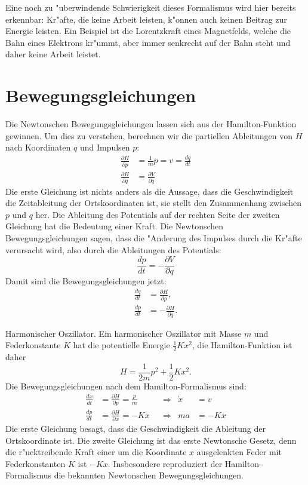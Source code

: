 Eine noch zu "uberwindende Schwierigkeit dieses Formalismus wird hier
bereits erkennbar: Kr"afte, die keine Arbeit leisten, k"onnen auch
keinen Beitrag zur Energie leisten.
Ein Beispiel ist
die Lorentzkraft eines Magnetfelds, welche die Bahn eines Elektrons 
kr"ummt, aber immer senkrecht auf der Bahn steht und daher keine Arbeit
leistet.

\section{Bewegungsgleichungen}
Die Newtonschen Bewegungsgleichungen lassen sich aus der Hamilton-Funktion
gewinnen. Um dies zu verstehen, berechnen wir die partiellen Ableitungen
von $H$ nach Koordinaten $q$ und Impulsen $p$:
\begin{align*}
\frac{\partial H}{\partial p}&=\frac{1}{m}p=v=\frac{dq}{dt} \\
\frac{\partial H}{\partial q}&=\frac{\partial V}{\partial q}
\end{align*}
Die erste Gleichung ist nichts anders als die Aussage, dass die
Geschwindigkeit die Zeitableitung der Ortskoordinaten ist, sie
stellt den Zusammenhang zwischen $p$ und $q$ her.
Die Ableitung des Potentials auf der rechten Seite der zweiten
Gleichung hat die Bedeutung einer Kraft.
Die Newtonschen Bewegungsgleichungen sagen, dass die "Anderung des
Impulses durch die Kr"afte verursacht wird, also durch die Ableitungen
des Potentials:
\[
\frac{dp}{dt}=-\frac{\partial V}{\partial q}
\]
Damit sind die Bewegungsgleichungen jetzt:
\begin{align}
\frac{dq}{dt}&= \frac{\partial H}{\partial p},\label{hamilton-v}\\
\frac{dp}{dt}&=-\frac{\partial H}{\partial q}.\label{hamilton-newton}
\end{align}

\begin{beispiel} Harmonischer Oszillator. Ein harmonischer Oszillator
mit Masse $m$ und Federkonstante $K$ hat die potentielle Energie $\frac12Kx^2$,
die Hamilton-Funktion ist daher
\[
H=\frac1{2m}p^2+\frac12Kx^2.
\]
Die Bewegungsgleichungen nach dem Hamilton-Formalismus sind:
\begin{align*}
\frac{dx}{dt}&=\frac{\partial H}{\partial p}=\frac{p}{m}&&\Rightarrow&\dot x&=v\\
\frac{dp}{dt}&=\frac{\partial H}{\partial x}=-Kx&&\Rightarrow&ma&=-Kx
\end{align*}
Die erste Gleichung besagt, dass die Geschwindigkeit die Ableitung
der Ortskoordinate ist.
Die zweite Gleichung ist das erste Newtonsche Gesetz, denn die
r"ucktreibende Kraft einer um die Koordinate $x$ ausgelenkten Feder
mit Federkonstanten $K$ ist $-Kx$.
Insbesondere reproduziert der Hamilton-Formalismus die bekannten
Newtonschen Bewegungsgleichungen.
\end{beispiel}

